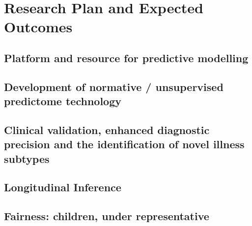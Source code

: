 \section{Research Plan and Expected Outcomes}\label{sec:research_plan}
\subsection{Platform and resource for predictive modelling}\label{ssec:platform}
\subsection{Development of normative / unsupervised predictome technology}\label{ssec:predictome}
\subsection{Clinical validation, enhanced diagnostic precision and the identification of novel illness subtypes}\label{ssec:clinical_validation}
\subsection{Longitudinal Inference}\label{ssec:longitudinal_inference}
\subsection{Fairness: children, under representative}\label{ssec:fairness}